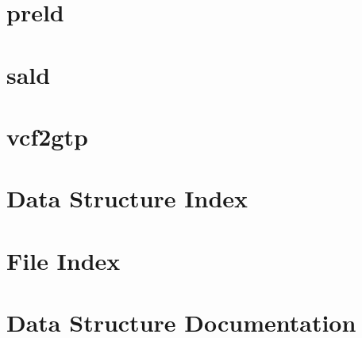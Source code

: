 \documentclass[letterpaper]{article}
\begin{document}
\section{preld}
\label{preld}
\hypertarget{preld}{}

\section{sald}
\label{sald}
\hypertarget{sald}{}

\section{vcf2gtp}
\label{vcf2gtp}
\hypertarget{vcf2gtp}{}

\section{\-Data \-Structure \-Index}

\section{\-File \-Index}

\section{\-Data \-Structure \-Documentation}









































\end{document}
